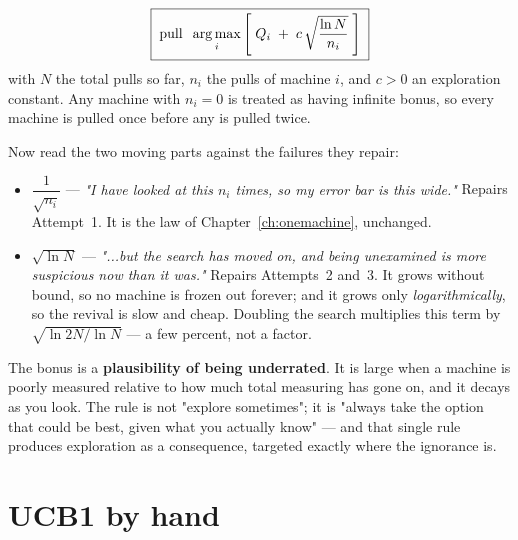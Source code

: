\begin{finalform}[UCB1]
\begin{equation}
  \label{eq:ucb1}
  \boxed{\;\text{pull}\;\; \operatorname*{arg\,max}_{i}\left[\; Q_i \;+\; c\,\sqrt{\frac{\ln N}{n_i}}\;\right]\;}
\end{equation}
with $N$ the total pulls so far, $n_i$ the pulls of machine $i$, and $c > 0$ an exploration
constant. Any machine with $n_i = 0$ is treated as having infinite bonus, so every machine
is pulled once before any is pulled twice.
\end{finalform}

Now read the two moving parts against the failures they repair:
\begin{itemize}
\item $\dfrac{1}{\sqrt{n_i}}$ --- \emph{"I have looked at this $n_i$ times, so my error bar
  is this wide."} Repairs Attempt~1. It is the law of Chapter~\ref{ch:onemachine}, unchanged.
\item $\sqrt{\ln N}$ --- \emph{"...but the search has moved on, and being unexamined is more
  suspicious now than it was."} Repairs Attempts~2 and~3. It grows without bound, so no
  machine is frozen out forever; and it grows only \emph{logarithmically}, so the revival is
  slow and cheap. Doubling the search multiplies this term by $\sqrt{\ln 2N/\ln N}$ --- a
  few percent, not a factor.
\end{itemize}

\begin{keyidea}
The bonus is a \textbf{plausibility of being underrated}. It is large when a machine is
poorly measured relative to how much total measuring has gone on, and it decays as you look.
The rule is not "explore sometimes"; it is "always take the option that could be best, given
what you actually know" --- and that single rule produces exploration as a consequence,
targeted exactly where the ignorance is.
\end{keyidea}

\section{UCB1 by hand}

